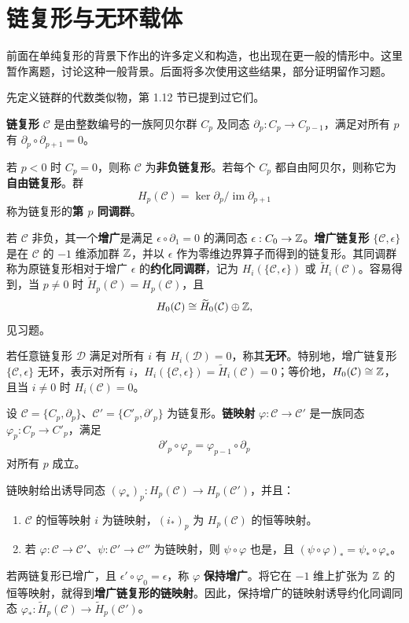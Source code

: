\section{链复形与无环载体}
前面在单纯复形的背景下作出的许多定义和构造，也出现在更一般的情形中。这里暂作离题，讨论这种一般背景。后面将多次使用这些结果，部分证明留作习题。

先定义链群的代数类似物，第 1.12 节已提到过它们。

\textbf{链复形} $\mathcal C$ 是由整数编号的一族阿贝尔群 $C_p$ 及同态 $\partial_p:C_p\to C_{p-1}$，满足对所有 $p$ 有 $\partial_p\circ\partial_{p+1}=0$。

若 $p<0$ 时 $C_p=0$，则称 $\mathcal C$ 为\textbf{非负链复形}。若每个 $C_p$ 都自由阿贝尔，则称它为\textbf{自由链复形}。群
\[
H_p(\mathcal C)=\ker\partial_p/\operatorname{im}\partial_{p+1}
\]
称为链复形的\textbf{第 $p$ 同调群}。

若 $\mathcal C$ 非负，其一个\textbf{增广}是满足 $\epsilon\circ\partial_1=0$ 的满同态 $\epsilon:C_0\to\mathbb{Z}$。\textbf{增广链复形} $\{\mathcal C,\epsilon\}$ 是在 $\mathcal C$ 的 $-1$ 维添加群 $\mathbb{Z}$，并以 $\epsilon$ 作为零维边界算子而得到的链复形。其同调群称为原链复形相对于增广 $\epsilon$ 的\textbf{约化同调群}，记为 $H_i(\{\mathcal C,\epsilon\})$ 或 $\widetilde H_i(\mathcal C)$。容易得到，当 $p\ne0$ 时 $\widetilde H_p(\mathcal C)=H_p(\mathcal C)$，且
\[
H_0(\mathcal C)\cong\widetilde H_0(\mathcal C)\oplus\mathbb{Z},
\]
见习题。

若任意链复形 $\mathcal D$ 满足对所有 $i$ 有 $H_i(\mathcal D)=0$，称其\textbf{无环}。特别地，增广链复形 $\{\mathcal C,\epsilon\}$ 无环，表示对所有 $i$，$H_i(\{\mathcal C,\epsilon\})=\widetilde H_i(\mathcal C)=0$；等价地，$H_0(\mathcal C)\cong\mathbb{Z}$，且当 $i\ne0$ 时 $H_i(\mathcal C)=0$。

设 $\mathcal C=\{C_p,\partial_p\}$、$\mathcal C'=\{C'_p,\partial'_p\}$ 为链复形。\textbf{链映射} $\varphi:\mathcal C\to\mathcal C'$ 是一族同态 $\varphi_p:C_p\to C'_p$，满足
\[
\partial'_p\circ\varphi_p=\varphi_{p-1}\circ\partial_p
\]
对所有 $p$ 成立。

链映射给出诱导同态 $(\varphi_*)_p:H_p(\mathcal C)\to H_p(\mathcal C')$，并且：
\begin{enumerate}[label=(\alph*)]
\item $\mathcal C$ 的恒等映射 $i$ 为链映射，$(i_*)_p$ 为 $H_p(\mathcal C)$ 的恒等映射。
\item 若 $\varphi:\mathcal C\to\mathcal C'$、$\psi:\mathcal C'\to\mathcal C''$ 为链映射，则 $\psi\circ\varphi$ 也是，且 $(\psi\circ\varphi)_*=\psi_*\circ\varphi_*$。
\end{enumerate}
若两链复形已增广，且 $\epsilon'\circ\varphi_0=\epsilon$，称 $\varphi$ \textbf{保持增广}。将它在 $-1$ 维上扩张为 $\mathbb{Z}$ 的恒等映射，就得到\textbf{增广链复形的链映射}。因此，保持增广的链映射诱导约化同调同态 $\varphi_*:\widetilde H_p(\mathcal C)\to\widetilde H_p(\mathcal C')$。


